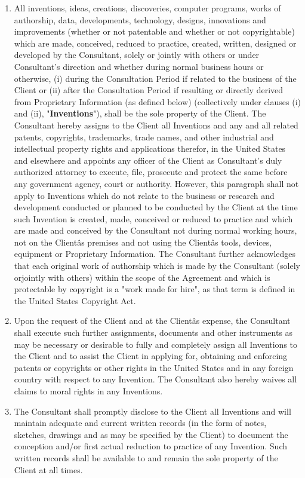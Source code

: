 \documentclass[12pt]{article}
\begin{document}
\begin{enumerate}
\begin{enumerate}
\begin{enumerate}[(1)]
            \item All inventions, ideas, creations, discoveries, computer programs, works of authorship, data, developments, technology, designs, innovations and improvements (whether or not patentable and whether or not copyrightable) which are made, conceived, reduced to practice, created, written, designed or developed by the Consultant, solely or jointly with others or under Consultant's direction and whether during normal business hours or otherwise, (i) during the Consultation Period if related to the business of the Client or (ii) after the Consultation Period if resulting or directly derived from Proprietary Information (as defined below) (collectively under clauses (i) and (ii), "{\bf Inventions}"), shall be the sole property of the Client.  The Consultant hereby assigns to the Client all Inventions and any and all related patents, copyrights, trademarks, trade names, and other industrial and intellectual property rights and applications therefor, in the United States and elsewhere and appoints any officer of the Client as Consultant's duly authorized attorney to execute, file, prosecute and protect the same before any government agency, court or authority.  However, this paragraph shall not apply to Inventions which do not relate to the business or research and development conducted or planned to be conducted by the Client at the time such Invention is created, made, conceived or reduced to practice and which are made and conceived by the Consultant not during normal working hours, not on the Clientâs premises and not using the Clientâs tools, devices, equipment or Proprietary Information. The Consultant further acknowledges that each original work of authorship which is made by the Consultant (solely orjointly with others) within the scope of the Agreement and which is protectable by copyright is a "work made for hire", as that term is defined in the United States Copyright Act.
            \item Upon the request of the Client and at the Clientâs expense, the Consultant shall execute such further assignments, documents and other instruments as may be necessary or desirable to fully and completely assign all Inventions to the Client and to assist the Client in applying for, obtaining and enforcing patents or copyrights or other rights in the United States and in any foreign country with respect to any Invention. The Consultant also hereby waives all claims to moral rights in any Inventions.
            \item The Consultant shall promptly disclose to the Client all Inventions and will maintain adequate and current written records (in the form of notes, sketches, drawings and as may be specified by the Client) to document the conception and/or first actual reduction to practice of any Invention.  Such written records shall be available to and remain the sole property of the Client at all times.

\end{enumerate}
\end{enumerate}
\end{enumerate}
\end{document}
